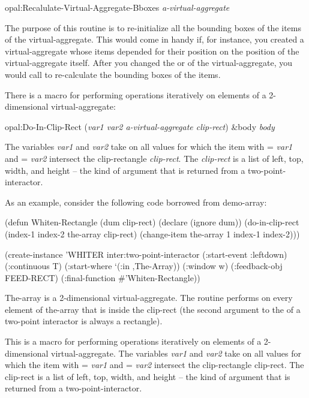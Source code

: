 \begin{programexample}
opal:Recalulate-Virtual-Aggregate-Bboxes {\it a-virtual-aggregate}\value{function}
\end{programexample}
  The purpose of this routine is to re-initialize all the bounding
boxes of the items of the virtual-aggregate.  This would come in
handy if, for instance, you created a virtual-aggregate whose items
depended for their position on the position of the virtual-aggregate
itself.  After you changed the  or  of the
virtual-aggregate,
you would call  to re-calculate
the bounding boxes of the items.


There is a macro for performing operations iteratively on
elements of a 2-dimensional virtual-aggregate:
\begin{programexample}
opal:Do-In-Clip-Rect ({\it var1  var2  a-virtual-aggregate  clip-rect}) \&body {\it body}\value{macro}
\end{programexample}
The variables {\it var1} and {\it var2} take on all values for which the item with
 = {\it var1} and  = {\it var2} intersect the
clip-rectangle {\it clip-rect}.
The {\it clip-rect} is a list of left, top, width, and height -- the kind of
argument that is returned from a two-point-interactor.

As an example, consider the following code borrowed from demo-array:
\begin{programexample}
(defun Whiten-Rectangle (dum clip-rect)
  (declare (ignore dum))
  (do-in-clip-rect (index-1 index-2 the-array clip-rect)
    (change-item the-array 1 index-1 index-2)))

(create-instance 'WHITER inter:two-point-interactor
   (:start-event :leftdown)
   (:continuous T)
   (:start-where `(:in ,The-Array))
   (:window w)
   (:feedback-obj FEED-RECT)
   (:final-function \#'Whiten-Rectangle))
\end{programexample}
The-array is a 2-dimensional virtual-aggregate.  The routine
performs  on every element of the-array that is
inside the clip-rect (the second argument to the  of
a two-point interactor is always a rectangle).



This is a macro for performing operations iteratively on
elements of a 2-dimensional virtual-aggregate.  The variables {\it var1} and
{\it var2} take on all values for which the item with  = {\it var1} and
 = {\it var2} intersect the clip-rectangle clip-rect.  The clip-rect
is a list of left, top, width, and height -- the kind of argument
that is returned from a two-point-interactor.





